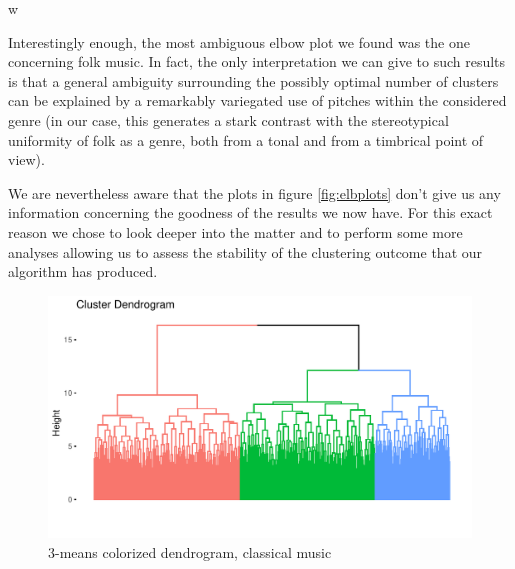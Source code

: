 w\documentclass[11pt, oneside]{article}
\begin{document}
Interestingly enough, the most ambiguous elbow plot we found was the one concerning folk music. In fact, the only interpretation we can give to such results is that a general ambiguity surrounding the possibly optimal number of clusters can be explained by a remarkably variegated use of pitches within the considered genre (in our case, this generates a stark contrast with the stereotypical uniformity of folk as a genre, both from a tonal and from a timbrical point of view).

We are nevertheless aware that the plots in figure \ref{fig:elbplots} don't give us any information concerning the goodness of the results we now have. For this exact reason we chose to look deeper into the matter and to perform some more analyses allowing us to assess the stability of the clustering outcome that our algorithm has produced.

\begin{figure}[h!]
\centering
\includegraphics[width=\textwidth]{ciaone_graph.pdf} 
\caption{3-means colorized dendrogram, classical music}
\label{fig:classicdend}
\end{figure}
\end{document}
